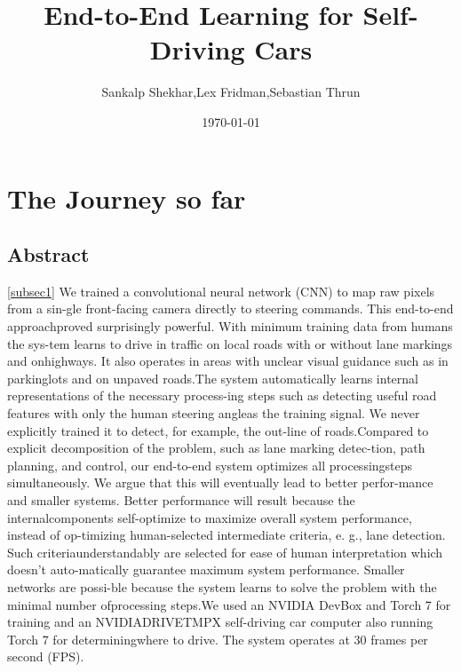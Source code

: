 \documentclass[a4paper]{report}
\begin{document}
		\title{End-to-End Learning for Self-Driving Cars}
		\author{Sankalp Shekhar,Lex Fridman,Sebastian Thrun}
		\date{\today}
		\maketitle
		\tableofcontents
		\newpage
		\chapter{The Journey so far}
		\section{Abstract}
		 \ref{subsec1} We trained a convolutional neural network (CNN) to map raw pixels from a sin-gle front-facing camera directly to steering commands. This end-to-end approachproved surprisingly powerful. With minimum training data from humans the sys-tem learns to drive in traffic on local roads with or without lane markings and onhighways. It also operates in areas with unclear visual guidance such as in parkinglots and on unpaved roads.The system automatically learns internal representations of the necessary process-ing steps such as detecting useful road features with only the human steering angleas the training signal. We never explicitly trained it to detect, for example, the out-line of roads.Compared to explicit decomposition of the problem, such as lane marking detec-tion, path planning, and control, our end-to-end system optimizes all processingsteps  simultaneously.   We  argue  that  this  will  eventually  lead  to  better  perfor-mance and smaller systems.  Better performance will result because the internalcomponents self-optimize to maximize overall system performance, instead of op-timizing human-selected intermediate criteria, e. g., lane detection.  Such criteriaunderstandably are selected for ease of human interpretation which doesn’t auto-matically guarantee maximum system performance.  Smaller networks are possi-ble because the system learns to solve the problem with the minimal number ofprocessing steps.We  used  an  NVIDIA  DevBox  and  Torch  7  for  training  and  an  NVIDIADRIVETMPX  self-driving  car  computer  also  running  Torch  7  for  determiningwhere to drive. The system operates at 30 frames per second (FPS).
		\newpage
\end{document}
